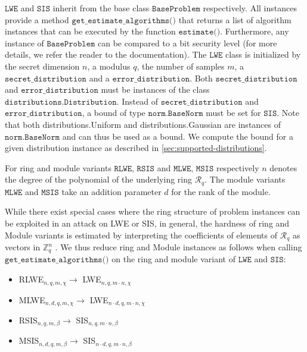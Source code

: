 \documentclass[
  a4paper,  %
  twoside,  %
  bibliography=totoc,
  headsepline,
  cleardoublepage=empty,
  parskip=half,
  draft=false
]{scrbook}
\begin{document}
$\texttt{LWE}$ and $\texttt{SIS}$ inherit from the base class $\texttt{BaseProblem}$ respectively. All instances provide a method $\texttt{get\_estimate\_algorithms()}$ that returns a list of algorithm instances that can be executed by the function $\texttt{estimate()}$. Furthermore, any instance of $\texttt{BaseProblem}$ can be compared to a bit security level (for more details, we refer the reader to the documentation). The $\texttt{LWE}$ class is initialized by the secret dimension $n$, a modulus $q$, the number of samples $m$, a $\texttt{secret\_distribution}$ and a $\texttt{error\_distribution}$. Both $\texttt{secret\_distribution}$ and $\texttt{error\_distribution}$ must be instances of the class $\texttt{distributions.Distribution}$. Instead of $\texttt{secret\_distribution}$ and $\texttt{error\_distribution}$, a bound of type $\texttt{norm.BaseNorm}$ must be set for $\texttt{SIS}$. Note that both {distributions.Uniform} and {distributions.Gaussian} are instances of $\texttt{norm.BaseNorm}$ and can thus be used as a bound. We compute the bound for a given distribution instance as described in \cref{sec:supported-distributions}.

For ring and module variants $\texttt{RLWE}$, $\texttt{RSIS}$ and $\texttt{MLWE}$, $\texttt{MSIS}$ respectively $n$ denotes the degree of the polynomial of the underlying ring $\mathcal{R}_q$. The module variants $\texttt{MLWE}$ and $\texttt{MSIS}$ take an addition parameter $d$ for the rank of the module.

While there exist special cases where the ring structure of problem instances can be exploited in an attack on LWE or SIS, %
in general, the hardness of ring and Module variants is estimated by interpreting the coefficients of elements of $\mathcal{R}_q$ as vectors in $\mathbb{Z}_q^n$ \cite{ACDDPPVW18}.
We thus reduce ring and Module instances as follows when calling $\texttt{get\_estimate\_algorithms()}$ on the ring and module variant of $\texttt{LWE}$ and $\texttt{SIS}$:
\begin{itemize}
  \item RLWE$_{n, q, m, \chi} \longrightarrow$ LWE$_{n, q, m \cdot n, \chi}$
  \item MLWE$_{n, d, q, m, \chi} \longrightarrow$ LWE$_{n \cdot d, q, m \cdot n, \chi}$
  \item RSIS$_{n, q, m, \beta} \longrightarrow$ SIS$_{n, q, m \cdot n, \beta}$
  \item MSIS$_{n, d, q, m, \beta} \longrightarrow$ SIS$_{n \cdot d, q, m \cdot n, \beta}$
\end{itemize}
\end{document}
